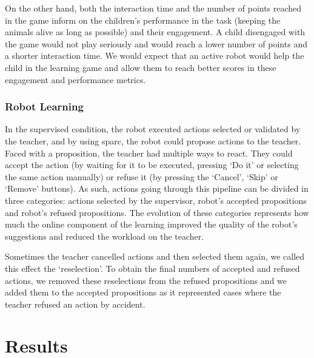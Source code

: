 On the other hand, both the interaction time and the number of points reached in the game inform on the children's performance in the task (keeping the animals alive as long as possible) and their engagement. A child disengaged with the game would not play seriously and would reach a lower number of points and a shorter interaction time. We would expect that an active robot would help the child in the learning game and allow them to reach better scores in these engagement and performance metrics.


\subsubsection{Robot Learning}

In the supervised condition, the robot executed actions selected or validated by the teacher, and by using \gls{sparc}, the robot could propose actions to the teacher. Faced with a proposition, the teacher had multiple ways to react. They could accept the action (by waiting for it to be executed, pressing `Do it' or selecting the same action manually) or refuse it (by pressing the `Cancel', `Skip' or `Remove' buttons). As such, actions going through this pipeline can be divided in three categories: actions selected by the supervisor, robot's accepted propositions and robot's refused propositions. The evolution of these categories represents how much the online component of the learning improved the quality of the robot's suggestions and reduced the workload on the teacher. 

Sometimes the teacher cancelled actions and then selected them again, we called this effect the `reselection'. To obtain the final numbers of accepted and refused actions, we removed these reselections from the refused propositions and we added them to the accepted propositions as it represented cases where the teacher refused an action by accident.

\section{Results}



